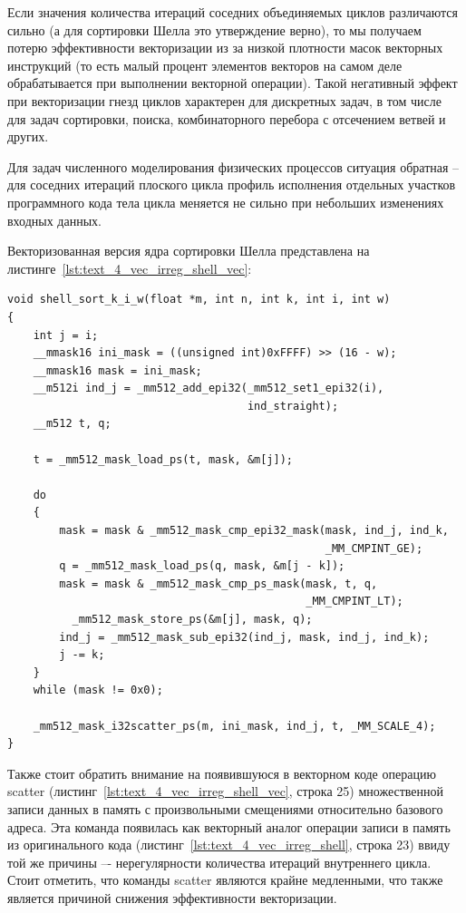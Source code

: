Если значения количества итераций соседних объединяемых циклов различаются сильно (а для сортировки Шелла это утверждение верно), то мы получаем потерю эффективности векторизации из за низкой плотности масок\label{term:vector_mask_density5} векторных инструкций (то есть малый процент элементов векторов на самом деле обрабатывается при выполнении векторной операции).
Такой негативный эффект при векторизации гнезд циклов характерен для дискретных задач, в том числе для задач сортировки, поиска, комбинаторного перебора с отсечением ветвей и других.

Для задач численного моделирования физических процессов ситуация обратная -- для соседних итераций плоского цикла профиль исполнения\label{term:execution_profile3} отдельных участков программного кода тела цикла меняется не сильно при небольших изменениях входных данных.

Векторизованная версия ядра сортировки Шелла представлена на листинге~\ref{lst:text_4_vec_irreg_shell_vec}:

\begin{lstlisting}[caption={Векторизованный вариант ядра сортировки Шелла.},label={lst:text_4_vec_irreg_shell_vec}]
void shell_sort_k_i_w(float *m, int n, int k, int i, int w)
{
    int j = i;
    __mmask16 ini_mask = ((unsigned int)0xFFFF) >> (16 - w);
    __mmask16 mask = ini_mask;
    __m512i ind_j = _mm512_add_epi32(_mm512_set1_epi32(i),
                                     ind_straight);
    __m512 t, q;

    t = _mm512_mask_load_ps(t, mask, &m[j]);

    do
    {
        mask = mask & _mm512_mask_cmp_epi32_mask(mask, ind_j, ind_k,
                                                 _MM_CMPINT_GE);
        q = _mm512_mask_load_ps(q, mask, &m[j - k]);
        mask = mask & _mm512_mask_cmp_ps_mask(mask, t, q,
                                              _MM_CMPINT_LT);
          _mm512_mask_store_ps(&m[j], mask, q);
        ind_j = _mm512_mask_sub_epi32(ind_j, mask, ind_j, ind_k);
        j -= k;
    }
    while (mask != 0x0);

    _mm512_mask_i32scatter_ps(m, ini_mask, ind_j, t, _MM_SCALE_4);
}
\end{lstlisting}

Также стоит обратить внимание на появившуюся в векторном коде операцию scatter (листинг~\ref{lst:text_4_vec_irreg_shell_vec}, строка 25) множественной записи данных в память с произвольными смещениями относительно базового адреса.
Эта команда появилась как векторный аналог операции записи в память из оригинального кода (листинг~\ref{lst:text_4_vec_irreg_shell}, строка 23) ввиду той же причины –- нерегулярности количества итераций внутреннего цикла.
Стоит отметить, что команды scatter являются крайне медленными, что также является причиной снижения эффективности векторизации.

